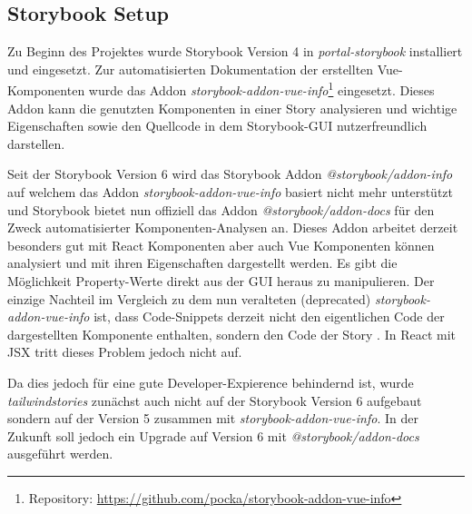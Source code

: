 \subsection{Storybook Setup}
\label{sec:storybooksetup}
Zu Beginn des Projektes wurde Storybook Version 4 in \textit{portal-storybook} installiert und eingesetzt. Zur automatisierten Dokumentation der erstellten Vue-Komponenten wurde das Addon \textit{storybook-addon-vue-info}\footnote{Repository: \url{https://github.com/pocka/storybook-addon-vue-info}} eingesetzt. Dieses Addon kann die genutzten Komponenten in einer Story analysieren und wichtige Eigenschaften sowie den Quellcode in dem Storybook-GUI nutzerfreundlich darstellen.

Seit der Storybook Version 6 wird das Storybook Addon \textit{@storybook/addon-info} auf welchem das Addon \textit{storybook-addon-vue-info} basiert nicht mehr unterstützt und Storybook bietet nun offiziell das Addon \textit{@storybook/addon-docs} für den Zweck automatisierter Komponenten-Analysen an. Dieses Addon arbeitet derzeit besonders gut mit React Komponenten aber auch Vue Komponenten können analysiert und mit ihren Eigenschaften dargestellt werden. Es gibt die Möglichkeit Property-Werte direkt aus der GUI heraus zu manipulieren. Der einzige Nachteil im Vergleich zu dem nun veralteten (deprecated) \textit{storybook-addon-vue-info} ist, dass Code-Snippets derzeit nicht den eigentlichen Code der dargestellten Komponente enthalten, sondern den Code der Story \citep{GithubIssueStorybook}. In React mit JSX tritt dieses Problem jedoch nicht auf.

Da dies jedoch für eine gute Developer-Expierence behindernd ist, wurde \textit{tailwindstories} zunächst auch nicht auf der Storybook Version 6 aufgebaut sondern auf der Version 5 zusammen mit \textit{storybook-addon-vue-info}. In der Zukunft soll jedoch ein Upgrade auf Version 6 mit \textit{@storybook/addon-docs} ausgeführt werden.

